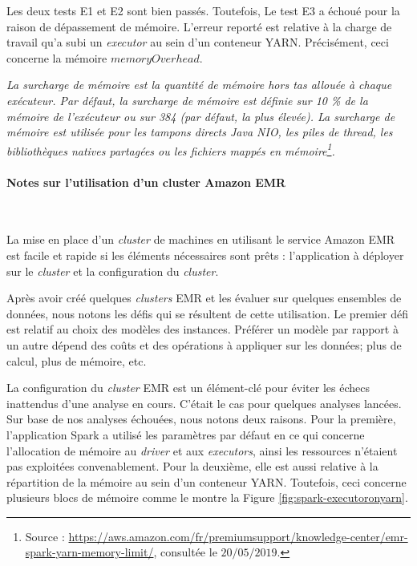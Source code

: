 Les deux tests E1 et E2 sont bien passés. Toutefois, Le test E3 a échoué pour la raison de dépassement de mémoire. L'erreur reporté est relative à la charge de travail qu'a subi un \textit{executor} au sein d'un conteneur YARN. Précisément, ceci concerne la mémoire $ memoryOverhead $. 

\textit{La surcharge de mémoire est la quantité de mémoire hors tas allouée à chaque exécuteur. Par défaut, la surcharge de mémoire est définie sur 10 \% de la mémoire de l'exécuteur ou sur 384 (par défaut, la plus élevée). La surcharge de mémoire est utilisée pour les tampons directs Java NIO, les piles de thread, les bibliothèques natives partagées ou les fichiers mappés en mémoire\footnote{Source : \url{https://aws.amazon.com/fr/premiumsupport/knowledge-center/emr-spark-yarn-memory-limit/}, consultée le $20/05/2019$.}.}

\paragraph{Notes sur l'utilisation d'un cluster Amazon EMR}~

La mise en place d'un \textit{cluster} de machines en utilisant le service Amazon EMR est facile et rapide si les éléments nécessaires sont prêts : l'application à déployer sur le \textit{cluster} et la configuration du \textit{cluster}.

Après avoir créé quelques \textit{clusters} EMR et les évaluer sur quelques ensembles de données, nous notons les défis qui se résultent de cette utilisation. 
Le premier défi est relatif au  choix des modèles des instances. Préférer un modèle par rapport à un autre dépend des coûts et   des opérations à appliquer sur les données; plus de calcul, plus de mémoire, etc.

La configuration du \textit{cluster} EMR est un élément-clé pour éviter les échecs inattendus d'une analyse en cours. C'était le cas pour  quelques analyses lancées. Sur base de nos  analyses échouées, nous notons deux  raisons. Pour la première,  l'application Spark a  utilisé les paramètres par défaut en ce qui concerne l'allocation de mémoire au  \textit{driver} et aux \textit{executors}, ainsi les ressources n'étaient pas exploitées convenablement.  Pour la deuxième, elle est aussi relative  à la répartition de la  mémoire au sein d'un conteneur YARN. Toutefois, ceci concerne plusieurs blocs de mémoire comme le montre la Figure 	\ref{fig:spark-executoronyarn}.


